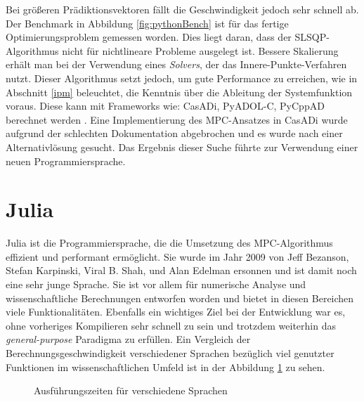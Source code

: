 \documentclass{like}
\begin{document}
Bei größeren Prädiktionsvektoren fällt die Geschwindigkeit jedoch sehr schnell ab. Der Benchmark in Abbildung \ref{fig:pythonBench} ist für das fertige Optimierungsproblem gemessen worden.
Dies liegt daran, dass der \ac{SLSQP}-Algorithmus nicht für nichtlineare Probleme ausgelegt ist. Bessere Skalierung erhält man bei der Verwendung eines \textit{Solvers}, der das Innere-Punkte-Verfahren nutzt. Dieser Algorithmus setzt jedoch, um gute Performance zu erreichen, wie in Abschnitt \ref{ipm} beleuchtet, die Kenntnis über die Ableitung der Systemfunktion voraus. Diese kann mit Frameworks wie: CasADi, PyADOL-C, PyCppAD berechnet werden \cite{DBLP:journals/corr/TurkinT16}. 
Eine Implementierung des \ac{MPC}-Ansatzes in CasADi wurde  aufgrund der schlechten Dokumentation abgebrochen und es wurde nach einer Alternativlösung gesucht. Das Ergebnis dieser Suche führte zur Verwendung einer neuen Programmiersprache. 


\section{Julia}
\label{julia}
Julia ist die Programmiersprache, die die Umsetzung des \acl{MPC}-Algorithmus effizient und performant ermöglicht. Sie wurde im Jahr 2009 von Jeff Bezanson, Stefan Karpinski, Viral B. Shah, und Alan Edelman ersonnen und ist damit noch eine sehr junge Sprache. Sie ist vor allem für numerische Analyse und wissenschaftliche Berechnungen entworfen worden und bietet in diesen Bereichen viele Funktionalitäten. Ebenfalls ein wichtiges Ziel bei der Entwicklung war es, ohne vorheriges Kompilieren sehr schnell zu sein und trotzdem weiterhin das \textit{general-purpose} Paradigma zu erfüllen. Ein Vergleich der Berechnungsgeschwindigkeit verschiedener Sprachen bezüglich viel genutzter Funktionen im wissenschaftlichen Umfeld ist in der Abbildung \ref{fig:juliaBench} zu sehen.

\begin{figure}[ht!]
	\centering
	 
	\caption{Ausführungszeiten für verschiedene Sprachen}
	\label{fig:juliaBench}
\end{figure}
\end{document}
